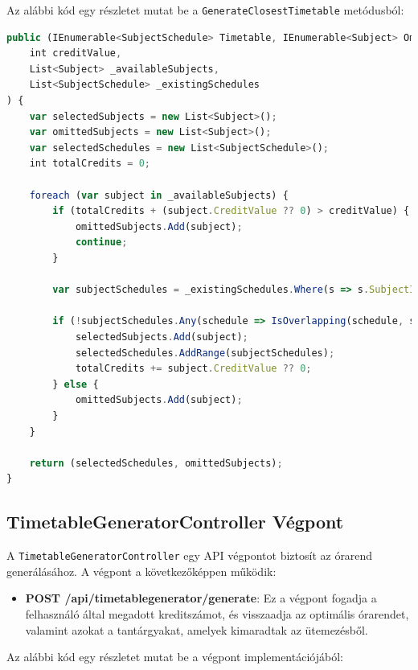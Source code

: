 \documentclass[colorlinks]{thesis-kando}
\theoremstyle{definition}
\theoremstyle{remark}
\begin{document}
Az alábbi kód egy részletet mutat be a \texttt{GenerateClosestTimetable} metódusból:

\begin{lstlisting}[language=JavaScript]
public (IEnumerable<SubjectSchedule> Timetable, IEnumerable<Subject> OmittedSubjects) GenerateClosestTimetable(
    int creditValue,
    List<Subject> _availableSubjects,
    List<SubjectSchedule> _existingSchedules
) {
    var selectedSubjects = new List<Subject>();
    var omittedSubjects = new List<Subject>();
    var selectedSchedules = new List<SubjectSchedule>();
    int totalCredits = 0;

    foreach (var subject in _availableSubjects) {
        if (totalCredits + (subject.CreditValue ?? 0) > creditValue) {
            omittedSubjects.Add(subject);
            continue;
        }

        var subjectSchedules = _existingSchedules.Where(s => s.SubjectId == subject.Id).ToList();

        if (!subjectSchedules.Any(schedule => IsOverlapping(schedule, selectedSchedules))) {
            selectedSubjects.Add(subject);
            selectedSchedules.AddRange(subjectSchedules);
            totalCredits += subject.CreditValue ?? 0;
        } else {
            omittedSubjects.Add(subject);
        }
    }

    return (selectedSchedules, omittedSubjects);
}
\end{lstlisting}

\subsection{TimetableGeneratorController Végpont}
A \texttt{TimetableGeneratorController} egy API végpontot biztosít az órarend generálásához. A végpont a következőképpen működik:

\begin{itemize}
    \item \textbf{POST /api/timetablegenerator/generate}: Ez a végpont fogadja a felhasználó által megadott kreditszámot, és visszaadja az optimális órarendet, valamint azokat a tantárgyakat, amelyek kimaradtak az ütemezésből.
\end{itemize}

Az alábbi kód egy részletet mutat be a végpont implementációjából:
\end{document}

